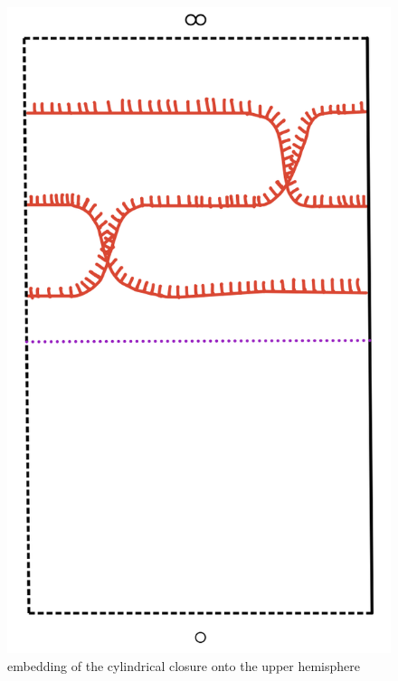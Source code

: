 \begin{figure}[H]
    \centering
    \includegraphics[scale = 0.95]{diagrams/natural_alternating_diagrams/4-1.png} 
    \caption{embedding of the cylindrical closure onto the upper hemisphere}
    \label{fig:your-label}
\end{figure}

